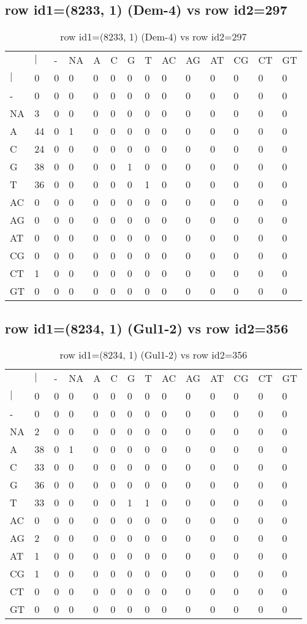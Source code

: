 \subsection{row id1=(8233, 1) (Dem-4) vs row id2=297}
\begin{center}
\begin{longtable}{|l|l|l|l|l|l|l|l|l|l|l|l|l|l|}
\caption{row id1=(8233, 1) (Dem-4) vs row id2=297} \label{table_dm352}\\
\hline
\\
\hline
&$|$&-&NA&A&C&G&T&AC&AG&AT&CG&CT&GT\\
$|$&0&0&0&0&0&0&0&0&0&0&0&0&0\\
-&0&0&0&0&0&0&0&0&0&0&0&0&0\\
NA&3&0&0&0&0&0&0&0&0&0&0&0&0\\
A&44&0&1&0&0&0&0&0&0&0&0&0&0\\
C&24&0&0&0&0&0&0&0&0&0&0&0&0\\
G&38&0&0&0&0&1&0&0&0&0&0&0&0\\
T&36&0&0&0&0&0&1&0&0&0&0&0&0\\
AC&0&0&0&0&0&0&0&0&0&0&0&0&0\\
AG&0&0&0&0&0&0&0&0&0&0&0&0&0\\
AT&0&0&0&0&0&0&0&0&0&0&0&0&0\\
CG&0&0&0&0&0&0&0&0&0&0&0&0&0\\
CT&1&0&0&0&0&0&0&0&0&0&0&0&0\\
GT&0&0&0&0&0&0&0&0&0&0&0&0&0\\
\hline
\end{longtable}
\end{center}

\subsection{row id1=(8234, 1) (Gul1-2) vs row id2=356}
\begin{center}
\begin{longtable}{|l|l|l|l|l|l|l|l|l|l|l|l|l|l|}
\caption{row id1=(8234, 1) (Gul1-2) vs row id2=356} \label{table_dm354}\\
\hline
\\
\hline
&$|$&-&NA&A&C&G&T&AC&AG&AT&CG&CT&GT\\
$|$&0&0&0&0&0&0&0&0&0&0&0&0&0\\
-&0&0&0&0&0&0&0&0&0&0&0&0&0\\
NA&2&0&0&0&0&0&0&0&0&0&0&0&0\\
A&38&0&1&0&0&0&0&0&0&0&0&0&0\\
C&33&0&0&0&0&0&0&0&0&0&0&0&0\\
G&36&0&0&0&0&0&0&0&0&0&0&0&0\\
T&33&0&0&0&0&1&1&0&0&0&0&0&0\\
AC&0&0&0&0&0&0&0&0&0&0&0&0&0\\
AG&2&0&0&0&0&0&0&0&0&0&0&0&0\\
AT&1&0&0&0&0&0&0&0&0&0&0&0&0\\
CG&1&0&0&0&0&0&0&0&0&0&0&0&0\\
CT&0&0&0&0&0&0&0&0&0&0&0&0&0\\
GT&0&0&0&0&0&0&0&0&0&0&0&0&0\\
\hline
\end{longtable}
\end{center}

